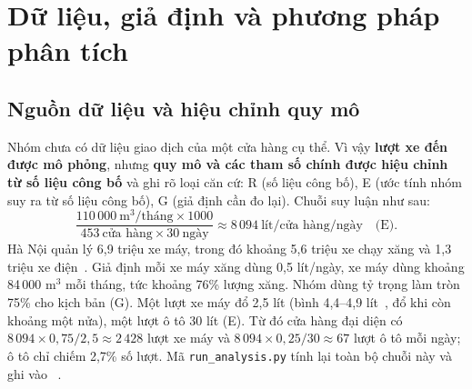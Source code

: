 
\section{Dữ liệu, giả định và phương pháp phân tích}
\label{r2:method}
\subsection{Nguồn dữ liệu và hiệu chỉnh quy mô}
Nhóm chưa có dữ liệu giao dịch của một cửa hàng cụ thể. Vì vậy \textbf{lượt xe
đến được mô phỏng}, nhưng \textbf{quy mô và các tham số chính được hiệu chỉnh
từ số liệu công bố} và ghi rõ loại căn cứ: R (số liệu công bố), E (ước tính
nhóm suy ra từ số liệu công bố), G (giả định cần đo lại). Chuỗi suy luận như sau:
\begin{equation}
\frac{110\,000\ \text{m}^3/\text{tháng}\times1000}{453\ \text{cửa hàng}\times30\ \text{ngày}}
\approx 8\,094\ \text{lít/cửa hàng/ngày}\quad\text{(E)}.
\end{equation}
Hà Nội quản lý 6,9 triệu xe máy, trong đó khoảng 5,6 triệu xe chạy xăng và
1,3 triệu xe điện~\cite{vnex2025}. Giả định mỗi xe máy xăng dùng 0,5 lít/ngày,
xe máy dùng khoảng 84\,000 m$^3$ mỗi tháng, tức khoảng 76\% lượng xăng. Nhóm
dùng tỷ trọng làm tròn 75\% cho kịch bản (G). Một lượt xe máy đổ 2,5 lít (bình
4,4--4,9 lít~\cite{tank}, đổ khi còn khoảng một nửa), một lượt ô tô 30 lít (E).
Từ đó cửa hàng đại diện có $8\,094\times0{,}75/2{,}5\approx2\,428$ lượt xe máy
và $8\,094\times0{,}25/30\approx67$ lượt ô tô mỗi ngày; ô tô chỉ chiếm 2,7\%
số lượt. Mã \texttt{run\_analysis.py} tính lại toàn bộ chuỗi này và ghi vào
~\cite{analysis}.

